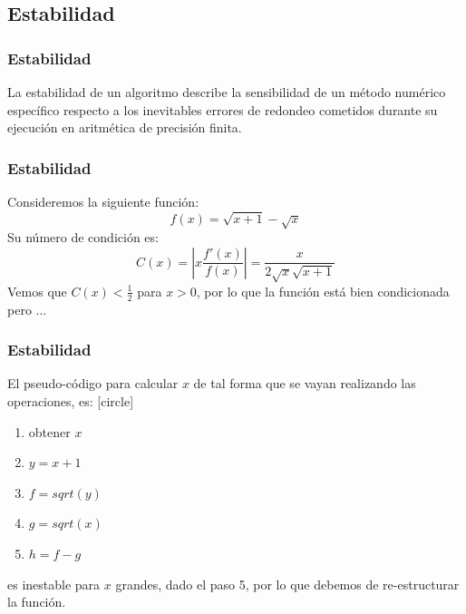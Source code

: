\subsection{Estabilidad}
\begin{frame}
\frametitle{Estabilidad}
La estabilidad de un algoritmo describe la sensibilidad de un método numérico específico
respecto a los inevitables errores de redondeo cometidos durante su ejecución en aritmética de precisión finita.
\end{frame}
\begin{frame}
\frametitle{Estabilidad}
Consideremos la siguiente función:
\[ f(x) = \sqrt{x+1} - \sqrt{x} \]
Su número de condición es:
\[ C(x) = \left | x \dfrac{f'(x)}{f(x)} \right | = \dfrac{x}{2 \sqrt{x} \sqrt{x+1}}\]
Vemos que $C(x)< \frac{1}{2}$ para $x>0$, por lo que la función está bien condicionada pero ...
\end{frame}
\begin{frame}
\frametitle{Estabilidad}
El pseudo-código para calcular $x$ de tal forma que se vayan realizando las operaciones, es:
[circle]
\begin{enumerate}[<+->]
\item obtener $x$
\item $y = x + 1$
\item $f = sqrt(y)$
\item $g = sqrt(x)$
\item $h = f-g$
\end{enumerate}
\pause
es inestable para $x$ grandes, dado el paso 5, por lo que debemos de re-estructurar la función.
\end{frame}
